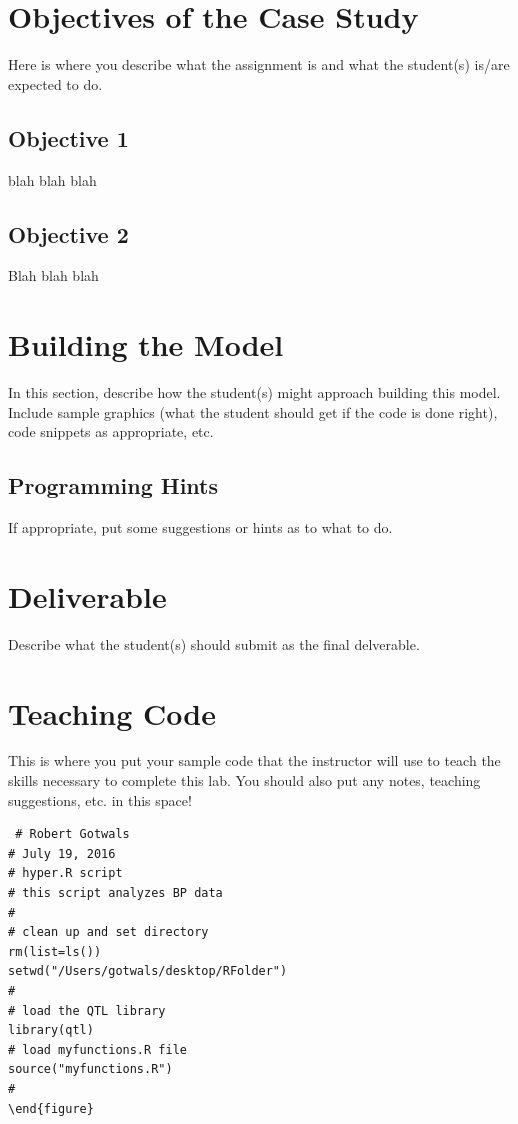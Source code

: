 \documentclass[11pt]{article}
\begin{document}
\section{Objectives of the Case Study}

Here is where you describe what the assignment is and what the student(s) is/are expected to do. 

\subsection{Objective 1}

blah blah blah

\subsection{Objective 2}

Blah blah blah
 

\section{Building the Model}

In this section, describe how the student(s) might approach building this model.  Include sample graphics (what the student should get if the code is done right), code snippets as appropriate, etc. 

 \subsection{Programming Hints}
 
If appropriate, put some suggestions or hints as to what to do.
 
\section{Deliverable}

Describe what the student(s) should submit as the final delverable.

\section{Teaching Code}

This is where you put your sample code that the instructor will use to teach the skills necessary to complete this lab.
You should also put any notes, teaching suggestions, etc. in this space!


\begin{verbatim}
 # Robert Gotwals
# July 19, 2016
# hyper.R script
# this script analyzes BP data
#
# clean up and set directory
rm(list=ls())
setwd("/Users/gotwals/desktop/RFolder")
#
# load the QTL library
library(qtl)
# load myfunctions.R file
source("myfunctions.R")
#
\end{figure}
\end{verbatim}
\end{document}
